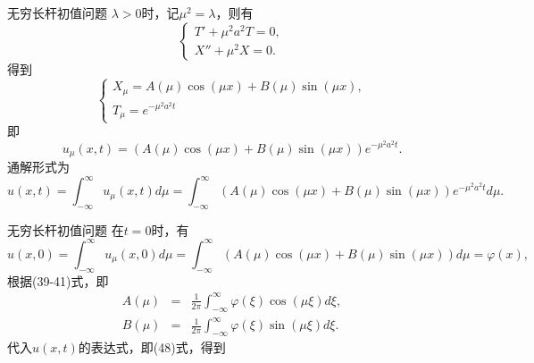 \documentclass[11pt]{beamer}
\begin{document}
\begin{frame}{无穷长杆初值问题}
$\lambda >0$时，记$\mu^2 = \lambda$，则有
\begin{equation}
\left\{
\begin{aligned}
T' + \mu^2 a^2 T = 0, \\
X'' + \mu^2 X = 0.
\end{aligned}
\right.
\end{equation}
得到
\begin{equation}
\left\{
\begin{aligned}
X_\mu = A(\mu)\cos(\mu x) + B(\mu) \sin(\mu x), \\
T_\mu = e^{-\mu^2 a^2 t}
\end{aligned}
\right.
\end{equation}
即
\begin{equation}
u_\mu(x,t) = (A(\mu)\cos(\mu x) + B(\mu) \sin(\mu x))e^{-\mu^2 a^2 t}.
\end{equation}
通解形式为
\begin{equation}
u(x,t) = \int^\infty_{-\infty} u_\mu(x,t) d\mu = \int^\infty_{-\infty} (A(\mu)\cos(\mu x) + B(\mu)\sin(\mu x))e^{-\mu^2 a^2 t} d\mu.
\end{equation}
\end{frame}

\begin{frame}{无穷长杆初值问题}
在$t=0$时，有
\begin{equation}
u(x,0) = \int^\infty_{-\infty} u_\mu(x,0) d\mu = \int^\infty_{-\infty} (A(\mu)\cos(\mu x) + B(\mu)\sin(\mu x)) d \mu = \varphi(x),
\end{equation}
根据(39-41)式，即
\begin{eqnarray}
A(\mu) &=& \frac{1}{2\pi} \int^\infty_{-\infty} \varphi(\xi) \cos(\mu \xi) d \xi, \\
B(\mu) &=& \frac{1}{2\pi} \int^\infty_{-\infty} \varphi(\xi) \sin(\mu \xi) d \xi.
\end{eqnarray}
代入$u(x,t)$的表达式，即(48)式，得到

\end{frame}
\end{document}
